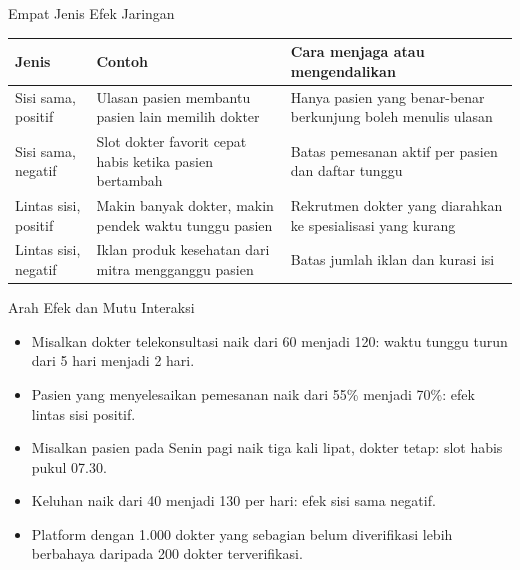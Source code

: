 \documentclass[aspectratio=169, table, 12pt]{beamer}
\begin{document}
\begin{frame}{{\Large Empat Jenis Efek Jaringan}}
  \footnotesize
  \begin{tabularx}{\textwidth}{>{\raggedright\arraybackslash}p{2.7cm}
      >{\raggedright\arraybackslash}X
      >{\raggedright\arraybackslash}X}
    \hline
    \textbf{Jenis} & \textbf{Contoh} & \textbf{Cara menjaga atau mengendalikan} \\ \hline
    Sisi sama, positif & Ulasan pasien membantu pasien lain memilih dokter & Hanya pasien yang benar-benar berkunjung boleh menulis ulasan \\ \hline
    Sisi sama, negatif & Slot dokter favorit cepat habis ketika pasien bertambah & Batas pemesanan aktif per pasien dan daftar tunggu \\ \hline
    Lintas sisi, positif & Makin banyak dokter, makin pendek waktu tunggu pasien & Rekrutmen dokter yang diarahkan ke spesialisasi yang kurang \\ \hline
    Lintas sisi, negatif & Iklan produk kesehatan dari mitra mengganggu pasien & Batas jumlah iklan dan kurasi isi \\ \hline
  \end{tabularx}
\end{frame}

\begin{frame}{{\Large Arah Efek dan Mutu Interaksi}}
  \vspace{4pt}
  \begin{itemize}
    \item Misalkan dokter telekonsultasi naik dari 60 menjadi 120: waktu tunggu turun dari 5 hari menjadi 2 hari.
    \item Pasien yang menyelesaikan pemesanan naik dari 55\% menjadi 70\%: efek lintas sisi positif.
    \item Misalkan pasien pada Senin pagi naik tiga kali lipat, dokter tetap: slot habis pukul 07.30.
    \item Keluhan naik dari 40 menjadi 130 per hari: efek sisi sama negatif.
    \item Platform dengan 1.000 dokter yang sebagian belum diverifikasi lebih berbahaya daripada 200 dokter terverifikasi.
  \end{itemize}
\end{frame}
\end{document}
